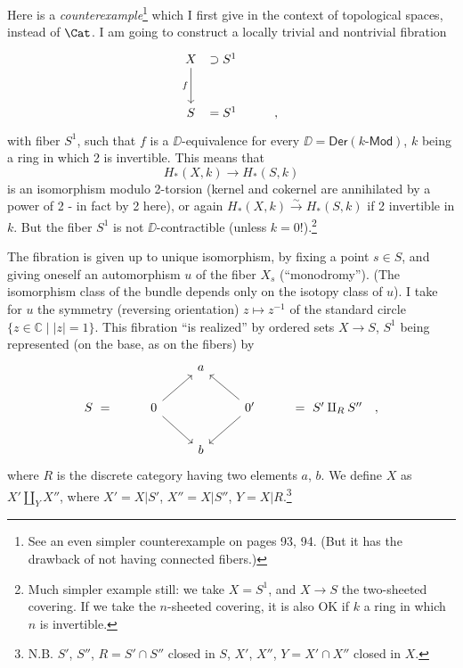 Here is a \textit{counterexample}\footnote[42]{See an even simpler counterexample on pages 93, 94. (But it has the drawback of not having connected fibers.) %
} which I first give in the context of topological spaces, instead of $\Cat$. I am going to construct a locally trivial and nontrivial fibration
\[
\begin{tikzcd}[column sep=0.2em, row sep=large]
X \arrow[d, "f"'] & \supset S^1 & \\
S & = S^1 & \qquad ,
\end{tikzcd}
\]
with fiber $S^1$, such that $f$ is a $\DD$-equivalence for every $\DD = \mathsf{Der}(k\text{-}\mathsf{Mod})$, $k$ being a ring in which 2 is invertible. This means that
\[
H_*(X,k) \longrightarrow H_*(S,k)
\]
is an isomorphism modulo 2-torsion (kernel and cokernel are annihilated by a power of 2 - in fact by 2 here), or again $H_*(X,k) \xrightarrow{\sim} H_*(S,k)$ if 2 invertible in $k$. But the fiber $S^1$ is not $\DD$-contractible (unless $k = 0$!).\footnote[43]{Much simpler example still: we take $X = S^1$, and $X \to S$ the two-sheeted covering. If we take the $n$-sheeted covering, it is also OK if $k$ a ring in which $n$ is invertible.}

\indent The fibration is given up to unique isomorphism, by fixing a point $s \in S$, and giving oneself an automorphism $u$ of the fiber $X_s$ (``monodromy''). (The isomorphism class of the bundle depends only on the isotopy class of $u$). I take for $u$ the symmetry (reversing orientation) $z \mapsto z^{-1}$ of the standard circle $\{z \in \mathbb{C} \mid |z| = 1\}$. This fibration ``is realized'' by ordered sets $X \to S$, $S^1$ being represented (on the base, as on the fibers) by %
\[
\begin{tikzcd}[column sep=normal, row sep=normal]
& & a & & \\
S \ = & 0 \arrow[ur] \arrow[dr] & & 0' \arrow[ul] \arrow[dl] & = \ S' \amalg_R S'' \quad , \\
& & b & &
\end{tikzcd}
\]
where $R$ is the discrete category having two elements $a$, $b$. We define $X$ as $X' \amalg_Y X''$, where $X' = X|S'$, $X'' = X|S''$, $Y = X|R$.\footnote[44]{N.B. $S'$, $S''$, $R = S' \cap S''$ closed in $S$, $X'$, $X''$, $Y = X' \cap X''$ closed in $X$.}